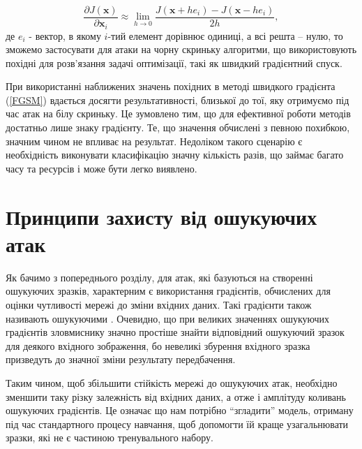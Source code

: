 \documentclass[14pt,a4paper]{extarticle}
\newcounter{e}
\numberwithin{equation}{section}
\numberwithin{figure}{section}
\begin{document}
 \begin{equation}
 \frac{\partial J(\mathbf{x})}{\partial \mathbf{x}_{i}} \approx
 \lim_{h \to 0} \frac{J\left(\mathbf{x}+h e_{i}\right)-J\left(\mathbf{x}-h e_{i}\right)}{2h},
 \label{df-zoo}
 \end{equation}
 де $e_i$ - вектор, в якому $i$-тий елемент дорівнює одиниці, а всі решта -- нулю, то зможемо застосувати для атаки на чорну скриньку алгоритми, що використовують похідні для розв'язання задачі оптимізації, такі як швидкий градієнтний спуск.

 При використанні наближених значень похідних в методі швидкого градієнта (\ref{FGSM}) вдається досягти результативності, близької до тої, яку отримуємо під час атак на білу скриньку. Це зумовлено тим, що для ефективної роботи методів достатньо лише знаку градієнту. Те, що значення обчислені з певною похибкою, значним чином не впливає на результат. Недоліком такого сценарію є необхідність виконувати класифікацію значну кількість разів, що займає багато часу та ресурсів і може бути легко виявлено.

 
 \newpage
 \thispagestyle{empty}
 \section{Принципи захисту від ошукуючих атак}
 
 Як бачимо з попереднього розділу, для атак, які базуються на створенні ошукуючих зразків, характерним є використання градієнтів, обчислених для оцінки чутливості мережі до зміни вхідних даних. Такі градієнти також називають ошукуючими \cite{defencive-distillation}. Очевидно, що при великих значеннях ошукуючих градієнтів зловмиснику значно простіше знайти відповідний ошукуючий зразок для деякого вхідного зображення, бо невеликі збурення вхідного зразка призведуть до значної зміни результату передбачення.
 
 Таким чином, щоб збільшити стійкість мережі до ошукуючих атак, необхідно зменшити таку різку залежність від вхідних даних, а отже і амплітуду коливань ошукуючих градієнтів. Це означає що нам потрібно ``згладити'' модель, отриману під час стандартного процесу навчання, щоб допомогти їй краще узагальнювати зразки, які не є частиною тренувального набору.
 
\end{document}
